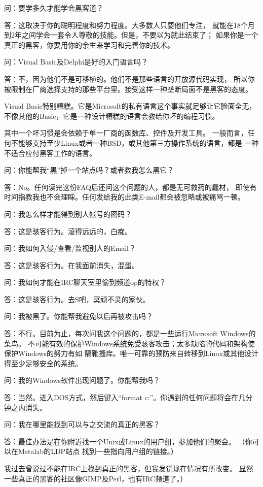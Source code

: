 \documentclass[a4paper,12pt,UTF8,twoside]{ctexbook}
\begin{document}
问：要学多久才能学会黑客道？

答：这取决于你的聪明程度和努力程度。大多数人只要他们专注， 就能在18个月到2年之间学会一套令人尊敬的技能。但是，不要以为就此结束了； 如果你是一个真正的黑客，你要用你的余生来学习和完善你的技术。

问：Visual Basic及Delphi是好的入门语言吗？

答：不，因为他们不是可移植的。他们不是那些语言的开放源代码实现， 所以你被限制在厂商选择支持的那些平台里。接受这样一种垄断局面不是黑客的态度。

Visual Basic特别糟糕。它是Microsoft的私有语言这个事实就足够让它脸面全无， 不像其他的Basic，它是一种设计糟糕的语言会教给你坏的编程习惯。

其中一个坏习惯是会依赖于单一厂商的函数库、控件及开发工具。 一般而言，任何不能够支持至少Linux或者一种BSD，或其他第三方操作系统的语言，都是 一种不适合应付黑客工作的语言。

问：你能帮我“黑”掉一个站点吗？或者教我怎么黑它？

答：No。任何读完这份FAQ后还问这个问题的人，都是无可救药的蠢材， 即使有时间指教我也不会理睬。任何发给我的此类E-mail都会被忽略或被痛骂一顿。

问：我怎么样才能得到别人帐号的密码？

答：这是骇客行为。滚得远远的，白痴。

问：我如何入侵/查看/监视别人的Email？

答：这是骇客行为。在我面前消失，混蛋。

问：我如何才能在IRC聊天室里偷到频道op的特权？

答：这是骇客行为。去S吧，冥顽不灵的家伙。

问：我被黑了。你能帮我避免以后再被攻击吗？

答：不行。目前为止，每次问我这个问题的，都是一些运行Microsoft Windows的菜鸟。 不可能有效的保护Windows系统免受骇客攻击；太多缺陷的代码和架构使保护Windows的努力有如 隔靴搔痒。唯一可靠的预防来自转移到Linux或其他设计得至少足够安全的系统。

问：我的Windows软件出现问题了。你能帮我吗？

答：当然。进入DOS方式，然后键入“format c:”。你遇到的任何问题将会在几分钟之内消失。

问：我在哪里能找到可以与之交流的真正的黑客？

答：最佳办法是在你附近找一个Unix或Linux的用户组，参加他们的聚会。 （你可以在Metalab的LDP站点 找到一些指向用户组的链接。）

我过去曾说过不能在IRC上找到真正的黑客，但我发觉现在情况有所改变。 显然一些真正的黑客的社区像GIMP及Perl，也有IRC频道了。）
\end{document}
